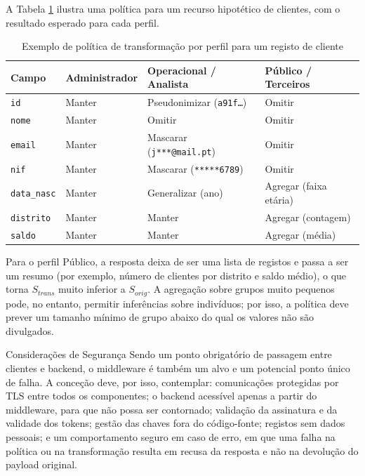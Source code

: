 \documentclass[12pt,reqno, twoside]{amsbook}
\makeatletter
\def\section{\@startsection{section}{1}%
      \z@{.5\linespacing\@plus.7\linespacing}{.25\linespacing}%
      {\normalfont\bfseries\flushleft}}
\theoremstyle{plain}
\numberwithin{equation}{chapter}
\numberwithin{table}{chapter}
\numberwithin{figure}{chapter}
\numberwithin{section}{chapter}
\makeatother
\begin{document}
\noindent A Tabela \ref{tab:politicas} ilustra uma política para um recurso hipotético de clientes, com o resultado esperado para cada perfil.

\begin{table}[htbp]
\centering
\caption{Exemplo de política de transformação por perfil para um registo de cliente}
\label{tab:politicas}
\small
\begin{tabular}{>{\raggedright\arraybackslash}p{2.6cm}>{\raggedright\arraybackslash}p{3.2cm}>{\raggedright\arraybackslash}p{3.8cm}>{\raggedright\arraybackslash}p{3.2cm}}
\toprule
\textbf{Campo} & \textbf{Administrador} & \textbf{Operacional / Analista} & \textbf{Público / Terceiros} \\
\midrule
\texttt{id} & Manter & Pseudonimizar (\texttt{a91f\ldots}) & Omitir \\
\texttt{nome} & Manter & Omitir & Omitir \\
\texttt{email} & Manter & Mascarar (\texttt{j***@mail.pt}) & Omitir \\
\texttt{nif} & Manter & Mascarar (\texttt{*****6789}) & Omitir \\
\texttt{data\_nasc} & Manter & Generalizar (ano) & Agregar (faixa etária) \\
\texttt{distrito} & Manter & Manter & Agregar (contagem) \\
\texttt{saldo} & Manter & Manter & Agregar (média) \\
\bottomrule
\end{tabular}
\end{table}

\noindent Para o perfil Público, a resposta deixa de ser uma lista de registos e passa a ser um resumo (por exemplo, número de clientes por distrito e saldo médio), o que torna $S_{trans}$ muito inferior a $S_{orig}$. A agregação sobre grupos muito pequenos pode, no entanto, permitir inferências sobre indivíduos; por isso, a política deve prever um tamanho mínimo de grupo abaixo do qual os valores não são divulgados.

\section{Considerações de Segurança}
\noindent Sendo um ponto obrigatório de passagem entre clientes e backend, o middleware é também um alvo e um potencial ponto único de falha. A conceção deve, por isso, contemplar: comunicações protegidas por TLS entre todos os componentes; o backend acessível apenas a partir do middleware, para que não possa ser contornado; validação da assinatura e da validade dos tokens; gestão das chaves fora do código-fonte; registos sem dados pessoais; e um comportamento seguro em caso de erro, em que uma falha na política ou na transformação resulta em recusa da resposta e não na devolução do payload original.
\end{document}
